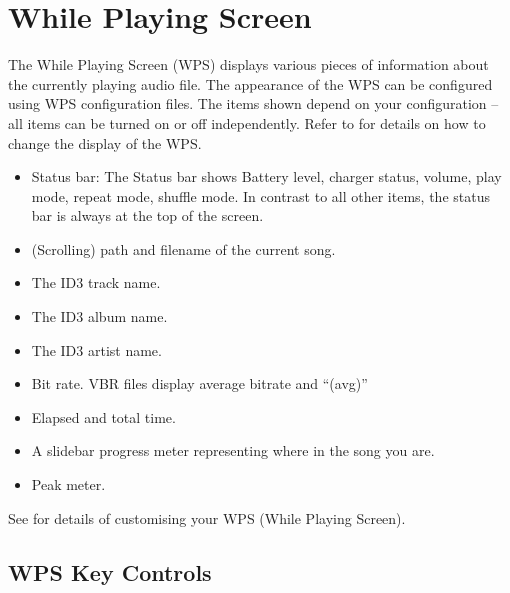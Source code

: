 \section{\label{ref:WPS}While Playing Screen}
The While Playing Screen (WPS) displays various pieces of information about the
currently playing audio file.
%
The appearance of the WPS can be configured using WPS configuration files.
The items shown depend on your configuration -- all items can be turned on
or off independently. Refer to  for details on how
to change the display of the WPS.
\begin{itemize}
\item Status bar: The Status bar shows Battery level, charger status,
  volume, play mode, repeat mode, shuffle mode.
  In contrast to all other items, the status bar is always at the top of
  the screen.
\item (Scrolling) path and filename of the current song.
\item The ID3 track name.
\item The ID3 album name.
\item The ID3 artist name.
\item Bit rate. VBR files display average bitrate and ``(avg)''
\item Elapsed and total time.
\item A slidebar progress meter representing where in the song you are.
\item Peak meter.
\end{itemize}
%

See  for details of customising
your WPS (While Playing Screen).


\subsection{\label{ref:WPS_Key_Controls}WPS Key Controls}

